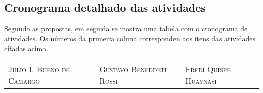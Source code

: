 \documentclass[a4paper, 11pt]{article}
\begin{document}
\subsection{Cronograma detalhado das atividades}
Segundo as propostas, em seguida se mostra uma tabela com o cronograma de atividades. Os números da primeira coluna corresponden aos itens das atividades  citadas acima.
\begin{table}[H]
\centering
{}
\caption{Cronograma das pr\'oximas etapas.}
\label{tab:cronograma}
\end{table}
\vspace{-0.8cm}


\newpage

 


\vfill \hfill
\begin{tabular}{p{5cm}p{5cm}p{5cm}}
\textsc{Julio I. Bueno de Camargo}  & \textsc{Gustavo Beneddeti Rossi}  \vspace{0.5cm} &  \textsc{Fredi Quispe Huaynasi}\\  
\end{tabular}
\end{document}
